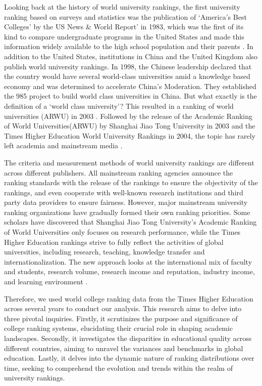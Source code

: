\documentclass[a4paper]{article}
\begin{document}
Looking back at the history of world university rankings, the first university ranking based on surveys and statistics was the publication of ‘America’s Best Colleges’ by the US News \& World Report’ in 1983, which was the first of its kind to compare undergraduate programs in the United States and made this information widely available to the high school population and their parents \cite{marope_rankings_2013}. In addition to the United States, institutions in China and the United Kingdom also publish world university rankings. In 1998, the Chinese leadership declared that the country would have several world-class universities amid a knowledge based economy and was determined to accelerate China’s Moderation. They established the 985 project to build world class universities in China. But what exactly is the definition of a ‘world class university’? This resulted in a ranking of world universities (ARWU) in 2003 \cite{marope_rankings_2013}.  Followed by the release of the Academic Ranking of World Universities(ARWU) by Shanghai Jiao Tong University in 2003 and the Times Higher Education World University Rankings in 2004, the topic has rarely left academia and mainstream media \cite{marope_rankings_2013}.

The criteria and measurement methods of world university rankings are different across different publishers. All mainstream ranking agencies announce the ranking standards with the release of the rankings to ensure the objectivity of the rankings, and even cooperate with well-known research institutions and third party data providers to ensure fairness.  However, major mainstream university ranking organizations have gradually formed their own ranking priorities. Some scholars have discovered that Shanghai Jiao Tong University’s Academic Ranking of World Universities only focuses on research performance\cite{hazelkorn_2013}, while the Times Higher Education rankings strive to fully reflect the activities of global universities, including research, teaching, knowledge transfer and internationalization. The new approach looks at the international mix of faculty and students, research volume, research income and reputation, industry income, and learning environment \cite{marope_rankings_2013}.

Therefore, we used world college ranking data from the Times Higher Education across several years to conduct our analysis. This research aims to delve into three pivotal inquiries. Firstly, it scrutinizes the purpose and significance of college ranking systems, elucidating their crucial role in shaping academic landscapes. Secondly, it investigates the disparities in educational quality across different countries, aiming to unravel the variances and benchmarks in global education. Lastly, it delves into the dynamic nature of ranking distributions over time, seeking to comprehend the evolution and trends within the realm of university rankings.
\end{document}
